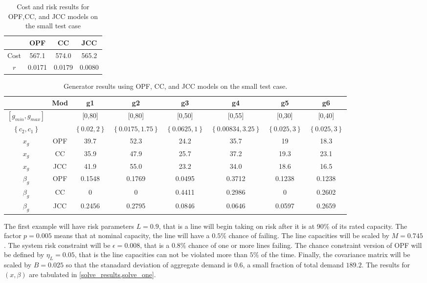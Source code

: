 \begin{table}
\centering
\begin{tabular}{ |c| c c c |}
\hline
& OPF & CC & JCC \\
\hline
\hline
Cost & 567.1 & 574.0 & 565.2\\
$r$ & 0.0171 & 0.0179 & 0.0080\\
\hline
\end{tabular}
\caption{Cost and risk results for OPF,CC, and JCC models on the small test case}\label{solve_results}
\end{table}

\begin{table}
\centering
\begin{tabular}{| c| c |c c c c c c |}
\hline
 & Mod & g1 & g2 & g3 & g4 & g5 & g6 \\
\hline
\hline
$\left[ g_{min}, g_{max} \right]$& & [0,80]&[0,80] &[0,50] &[0,55] &[0,30] &[0,40]  \\
$\left\{ c_2, c_1 \right\}$ && $\left\{0.02,2\right\}$  &$\left\{0.0175,1.75\right\}$ &$\left\{0.0625,1\right\}$ &$\left\{0.00834,3.25\right\}$ &$\left\{0.025,3\right\}$ &$\left\{0.025,3\right\}$  \\
\hline
\hline
$x_g$ &OPF& 39.7  &  52.3  &  24.2  &  35.7  &  19  &  18.3   \\
$x_g$ &CC& 35.9  &  47.9  &  25.7  &  37.2  &  19.3  &  23.1    \\
$x_g$ &JCC& 41.9  &  55.0  &  23.2  &  34.0  &  18.6  &  16.5    \\
\hline
$\beta_g$ &OPF& 0.1548  &  0.1769  &  0.0495  &  0.3712  &  0.1238  &  0.1238    \\
$\beta_g$ &CC& 0  &  0  &  0.4411  &  0.2986  &  0  &  0.2602   \\
$\beta_g$ &JCC& 0.2456  &  0.2795  &  0.0846  &  0.0646  &  0.0597  &  0.2659   \\
\hline
\end{tabular}
\caption{Generator results using OPF, CC, and JCC models on the small test case.}\label{solve_one}
\end{table}

The first example will have risk parameters $L=0.9$, that is a line will begin taking on risk after it is at 90\% of its rated capacity.  The factor $p=0.005$ means that at nominal capacity, the line will have a $0.5\%$ chance of failing.  The line capacities will be scaled by $M=0.745$. The system risk constraint will be $\epsilon=0.008$, that is a $0.8\%$ chance of one or more lines failing.  The chance constraint version of OPF will be defined by $\eta_L=0.05$, that is the line capacities can not be violated more than $5\%$ of the time.  Finally, the covariance matrix will be scaled by $B=0.025$ so that the stanadard deviation of aggregate demand is $0.6$, a small fraction of total demand $189.2$.  The results for $(x,\beta)$ are tabulated in \cref{solve_results,solve_one}.



